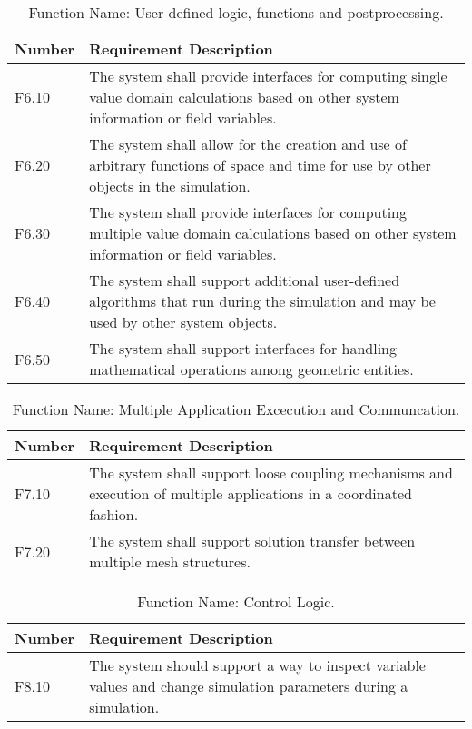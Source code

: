 \documentclass{INLreport}
\begin{document}
\begin{table}[!htbp]
  \caption{Function Name: User-defined logic, functions and postprocessing.\label{tab:pp}}
  \setcounter{MySixthTableCounter}{1}
  \begin{tabular}{|l|p{12cm}|}
    \rowcolor{gray}
    Number & Requirement Description \\ \hline
    F6.10 & The system shall provide interfaces for computing single value domain calculations based on other system information or field variables. \\ \hline
    F6.20 & The system shall allow for the creation and use of arbitrary functions of space and time for use by other objects in the simulation. \\ \hline
    F6.30 & The system shall provide interfaces for computing multiple value domain calculations based on other system information or field variables. \\ \hline
    F6.40 & The system shall support additional user-defined algorithms that run during the simulation and may be used by other system objects. \\ \hline
    F6.50 & The system shall support interfaces for handling mathematical operations among geometric entities. \\ \hline
  \end{tabular}
\end{table}

\begin{table}[!htbp]
  \caption{Function Name: Multiple Application Excecution and Communcation.\label{tab:multiapp}}
  \setcounter{MySeventhTableCounter}{1}
  \begin{tabular}{|l|p{12cm}|}
    \rowcolor{gray}
    Number & Requirement Description \\ \hline
    F7.10 & The system shall support loose coupling mechanisms and execution of multiple applications in a coordinated fashion. \\ \hline
    F7.20 & The system shall support solution transfer between multiple mesh structures. \\ \hline
  \end{tabular}
\end{table}

\begin{table}[!htbp]
  \caption{Function Name: Control Logic.\label{tab:cl}}
  \setcounter{MyEighthTableCounter}{1}
  \begin{tabular}{|l|p{12cm}|}
    \rowcolor{gray}
    Number & Requirement Description \\ \hline
    F8.10 & The system should support a way to inspect variable values and change simulation parameters during a simulation. \\ \hline
  \end{tabular}
\end{table}
\end{document}
